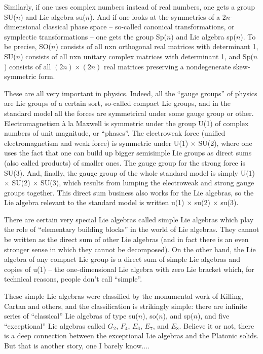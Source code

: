 Similarly, if one uses complex numbers instead of real numbers, 
one gets a group SU($n$) and Lie algebra su($n$).  And if one looks at the 
symmetries of a $2n$-dimensional classical phase
space -- so-called canonical transformations, or symplectic
transformations -- one gets the group Sp($n$) and Lie algebra sp($n$).  
To be precise, SO($n$) consists of all nxn orthogonal real matrices with
determinant 1, SU($n$) consists of all nxn unitary complex matrices with
determinant 1, and Sp($n$) consists of all $(2n) \times (2n)$ real matrices
preserving a nondegenerate skew-symmetric form.

These are all very important in physics.  Indeed, all the ``gauge groups''
of physics are Lie groups of a certain sort, so-called compact
Lie groups, and in the standard model all the forces are
symmetrical under some gauge group or other.  Electromagnetism \`a la
Maxwell is symmetric under the group U(1) of complex numbers of unit
magnitude, or ``phases''.  The electroweak force (unified electromagnetism
and weak force) is symmetric under U(1) $\times$ SU(2), where one uses the fact
that one can build up bigger semisimple Lie groups as direct sums
(also called products) of smaller ones.  The gauge group for the
strong force is SU(3).  And, finally, the gauge group of the whole
standard model is simply U(1) $\times$ SU(2) $\times$ SU(3), which results from
lumping the electroweak and strong gauge groups together.  This direct
sum business also works for the Lie algebras, so the Lie algebra
relevant to the standard model is written u(1) $\times$ su(2) $\times$ su(3).

There are certain very special Lie algebras called simple Lie algebras
which play the role of ``elementary building blocks'' in the world of Lie
algebras.  They cannot be written as the direct sum of other Lie
algebras (and in fact there is an even stronger sense in which they
cannot be decomposed).  On the other hand, the Lie algebra of any
compact Lie group is a direct sum of simple Lie algebras and copies of
u(1) -- the one-dimensional Lie algebra with zero Lie bracket which, for
technical reasons, people don't call ``simple''.  

These simple Lie algebras were classified by the monumental work of
Killing, Cartan and others, and the classification is strikingly simple:
there are infinite series of ``classical'' Lie algebras of type
su($n$), so($n$), and sp($n$), and five ``exceptional'' Lie algebras
called $G_2$, $F_4$, $E_6$, $E_7$, and $E_8$.  Believe it or not, there is a deep
connection between the exceptional Lie algebras and the Platonic solids.
But that is another story, one I barely know....


